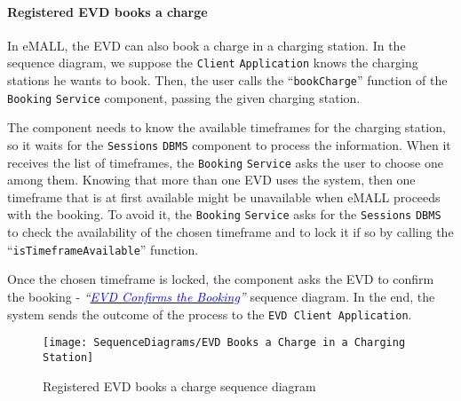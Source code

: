 \paragraph{Registered EVD books a charge}
In eMALL, the EVD can also book a charge in a charging station.
In the sequence diagram, we suppose the \verb|Client| \verb|Application| knows the charging stations he wants to book.
Then, the user calls the ``\verb|bookCharge|'' function of the \verb|Booking| \verb|Service| component, passing the given charging station.

The component needs to know the available timeframes for the charging station, so it waits for the \verb|Sessions| \verb|DBMS| component to process the information.
When it receives the list of timeframes, the \verb|Booking| \verb|Service| asks the user to choose one among them.
Knowing that more than one EVD uses the system, then one timeframe that is at first available might be unavailable when eMALL proceeds with the booking.
To avoid it, the \verb|Booking| \verb|Service| asks for the \verb|Sessions| \verb|DBMS| to check the availability of the chosen timeframe and to lock it if so by calling the ``\verb|isTimeframeAvailable|'' function.

Once the chosen timeframe is locked, the component asks the EVD to confirm the booking - \textit{``}\hyperlink{evdconfirmsbooking}{\textcolor{blue}{\textit{EVD Confirms the Booking}}}\textit{''} sequence diagram.
In the end, the system sends the outcome of the process to the \verb|EVD Client Application|.
\begin{figure}[H]
    \begin{center}
        \texttt{[image: SequenceDiagrams/EVD Books a Charge in a Charging Station]}
        \caption{Registered EVD books a charge sequence diagram}
        \label{fig:evd_books_charge_charging_station}
    \end{center}
\end{figure}

